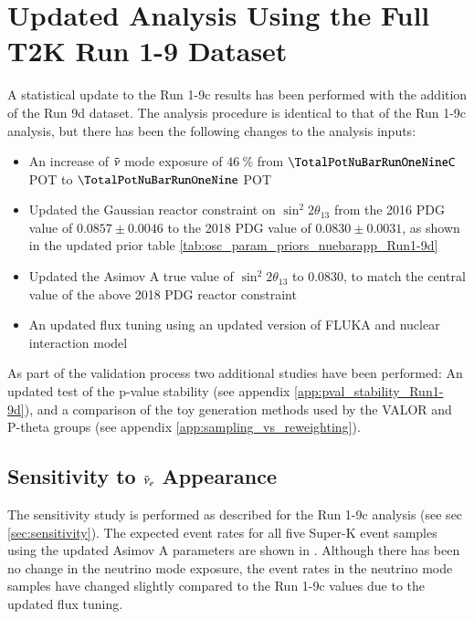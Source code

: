 \clearpage

{\color{red} 

\section {Updated Analysis Using the Full T2K Run 1-9 Dataset} \label{sec:run1-9d_update}

A statistical update to the Run 1-9c results has been performed with the addition of the Run 9d dataset. The analysis procedure is identical to that of the Run 1-9c analysis, but there has been the following changes to the analysis inputs:

\begin{itemize}
	\item An increase of $\bar{\nu}$ mode exposure of $\SI{46}{\%}$ from $\TotalPotNuBarRunOneNineC$ POT to $\TotalPotNuBarRunOneNine$ POT
	\item Updated the Gaussian reactor constraint on $\sin^{2} 2 \theta_{13}$ from the 2016 PDG value of $0.0857 \pm 0.0046$ to the 2018 PDG value of $0.0830 \pm 0.0031$, as shown in the updated prior table \ref{tab:osc_param_priors_nuebarapp_Run1-9d}
	\item Updated the Asimov A true value of $\sin^{2} 2 \theta_{13}$ to 0.0830, to match the central value of the above 2018 PDG reactor constraint
	\item An updated flux tuning using an updated version of FLUKA and nuclear interaction model \cite{flux_tuning_Run1-9d}
\end{itemize}



As part of the validation process two additional studies have been performed: An updated test of the p-value stability (see appendix \ref{app:pval_stability_Run1-9d}), and a comparison of the toy generation methods used by the VALOR and P-theta groups (see appendix \ref{app:sampling_vs_reweighting}).



\subsection{Sensitivity to $\bar{\nu}_{e}$ Appearance} \label{sec:run1-9d_sensitivity}

The sensitivity study is performed as described for the Run 1-9c analysis (see sec \ref{sec:sensitivity}). The expected event rates for all five Super-K event samples using the updated Asimov A parameters are shown in . Although there has been no change in the neutrino mode exposure, the event rates in the neutrino mode samples have changed slightly compared to the Run 1-9c values due to the updated flux tuning.

}
